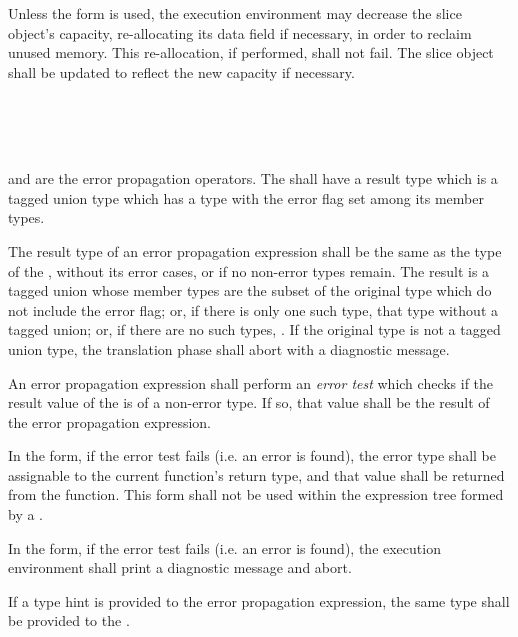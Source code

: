 \specsubsubitem
Unless the  form is used, the execution environment may
decrease the slice object's capacity, re-allocating its data field if necessary,
in order to reclaim unused memory. This re-allocation, if performed, shall not
fail. The slice object shall be updated to reflect the new capacity if
necessary.


\begin{grammar}
 \\
	  \\
	 \terminal{!} \\
\end{grammar}

\specsubsubitem
{} and \terminal{!} are the error propagation operators. The
 shall have a result type which is
a tagged union type which has a type with the error flag set
among its member types.

\specsubsubitem
The result type of an error propagation expression shall be the same as the
type of the , without its error cases, or
 if no non-error types remain. The result is a tagged union
whose member types are the subset of the original type which do not include the
error flag; or, if there is only one such type, that type without a tagged
union; or, if there are no such types, . If the original type is
not a tagged union type, the translation phase shall abort with a diagnostic
message.

\specsubsubitem
An error propagation expression shall perform an \textit{error test} which
checks if the result value of the  is of a
non-error type. If so, that value shall be the result of the error propagation
expression.

\specsubsubitem
In the  form, if the error test fails (i.e. an error is found), the
error type shall be assignable to the current function's return type, and that
value shall be returned from the function. This form shall not be used within
the expression tree formed by a .

\specsubsubitem
In the \terminal{!} form, if the error test fails (i.e. an error is found), the
execution environment shall print a diagnostic message and abort.

\specsubsubitem
If a type hint is provided to the error propagation expression, the same type
shall be provided to the .


